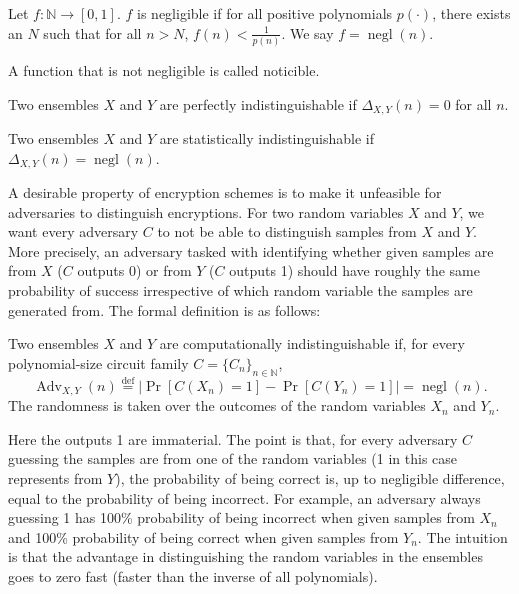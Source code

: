 \begin{definition}
    Let $f \colon \mathbb{N} \to [0,1]$. $f$ is negligible if for all positive polynomials $p(\cdot)$, there exists an $N$ such that for all $n>N$, $f(n) < \frac{1}{p(n)}$. We say $f = \operatorname{negl}(n)$.
\end{definition}
A function that is not negligible is called noticible.

\begin{definition}
    Two ensembles $X$ and $Y$ are perfectly indistinguishable if $\Delta_{X,Y}(n) = 0$ for all $n$.
\end{definition}
\begin{definition}
    Two ensembles $X$ and $Y$ are statistically indistinguishable if $\Delta_{X,Y}(n) = \operatorname{negl}(n)$.
\end{definition}

 A desirable property of encryption schemes is to make it unfeasible for adversaries to distinguish encryptions. For two random variables $X$ and $Y$, we want every adversary $C$ to not be able to distinguish samples from $X$ and $Y$. More precisely, an adversary tasked with identifying whether given samples are from $X$ ($C$ outputs 0) or from $Y$ ($C$ outputs 1) should have roughly the same probability of success irrespective of which random variable the samples are generated from. The formal definition is as follows:
 
\begin{definition}
    Two ensembles $X$ and $Y$ are computationally indistinguishable if, for every polynomial-size circuit family $C = \{C_n\}_{n \in \mathbb{N}}$, $$\operatorname{Adv}_{X,Y}(n) \stackrel{\mathrm{def}}{=} |\operatorname{Pr}[C(X_n) = 1] - \operatorname{Pr}[C(Y_n) = 1]| = \operatorname{negl}(n).$$
    The randomness is taken over the outcomes of the random variables $X_n$ and $Y_n$.
\end{definition}

Here the outputs 1 are immaterial. The point is that, for every adversary $C$ guessing the samples are from one of the random variables (1 in this case represents from $Y$), the probability of being correct is, up to negligible difference, equal to the probability of being incorrect. For example, an adversary always guessing 1 has 100\% probability of being incorrect when given samples from $X_n$ and 100\% probability of being correct when given samples from $Y_n$. The intuition is that the advantage in distinguishing the random variables in the ensembles goes to zero fast (faster than the inverse of all polynomials).

